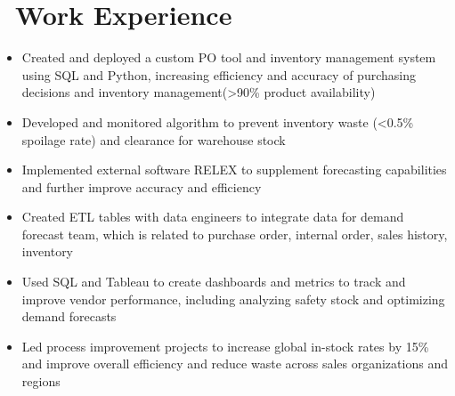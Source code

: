 \documentclass{resume}
\begin{document}
\section{
\texorpdfstring{\faUsers\ Work
Experience}
{-{}--Work Experience}}
\begin{itemize}
      \item Created and deployed a custom PO tool and inventory management
            system using SQL and Python, increasing efficiency and accuracy of
            purchasing decisions and inventory management(>90\% product
            availability)
      \item Developed and monitored algorithm to prevent inventory waste
            (<0.5\% spoilage rate) and clearance for warehouse stock
      \item Implemented external software RELEX to supplement forecasting
            capabilities and further improve accuracy and efficiency
      \item Created ETL tables with data engineers to integrate data for demand
            forecast team, which is related to purchase order, internal order,
            sales history, inventory
      \item Used SQL and Tableau to create dashboards and metrics to track and
            improve vendor performance, including analyzing safety stock and
            optimizing demand forecasts
      \item Led process improvement projects to increase global in-stock rates
            by 15\% and improve overall efficiency and reduce waste across
            sales organizations and regions
\end{itemize}
\end{document}
